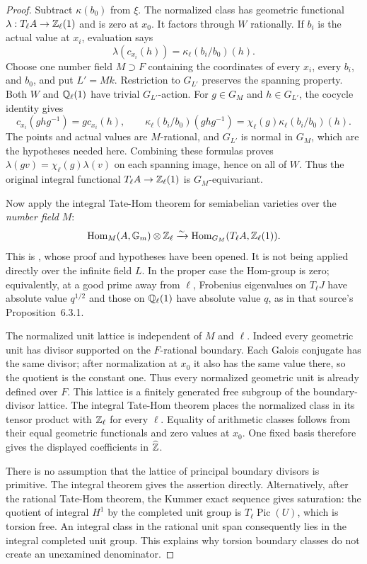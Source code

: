 \begin{proof}
Subtract $\kappa(b_0)$ from $\xi$. The normalized class has
geometric functional
$\lambda:T_\ell A\to\mathbb Z_\ell(1)$ and is zero at $x_0$.
It factors through $W$ rationally. If $b_i$ is the actual value
at $x_i$, evaluation says
\[
 \lambda(c_{x_i}(h))=\kappa_\ell(b_i/b_0)(h).
\]
Choose one number field $M\supset F$ containing the coordinates
of every $x_i$, every $b_i$, and $b_0$, and put $L'=Mk$.
Restriction to $G_{L'}$ preserves the spanning property.
Both $W$ and $\mathbb Q_\ell(1)$ have trivial $G_{L'}$-action.
For $g\in G_M$ and $h\in G_{L'}$, the cocycle identity gives
\[
 c_{x_i}(ghg^{-1})=g c_{x_i}(h),\qquad
 \kappa_\ell(b_i/b_0)(ghg^{-1})
     =\chi_\ell(g)\kappa_\ell(b_i/b_0)(h).
\]
The points and actual values are $M$-rational, and $G_{L'}$
is normal in $G_M$, which are the hypotheses needed here.
Combining these formulas proves
$\lambda(gv)=\chi_\ell(g)\lambda(v)$ on each spanning image,
hence on all of $W$. Thus the original integral functional
$T_\ell A\to\mathbb Z_\ell(1)$ is $G_M$-equivariant.

Now apply the integral Tate-Hom theorem for semiabelian
varieties over the \emph{number field} $M$:
\[
 \operatorname{Hom}_M(A,\mathbb G_m)\otimes\mathbb Z_\ell
 \xrightarrow{\sim}
 \operatorname{Hom}_{G_M}(T_\ell A,\mathbb Z_\ell(1)).
\]
This is \citet[Lemma~6.3.2, pp.~81--82]{F_Jossen2009}, whose
proof and hypotheses have been opened. It is not being applied
directly over the infinite field $L$.
In the proper case the Hom-group is zero; equivalently, at a
good prime away from $\ell$, Frobenius eigenvalues on $T_\ell J$
have absolute value $q^{1/2}$ and those on $\mathbb Q_\ell(1)$ have
absolute value $q$, as in that source's Proposition~6.3.1.

The normalized unit lattice is independent of $M$ and $\ell$.
Indeed every geometric unit has divisor supported on the
$F$-rational boundary. Each Galois conjugate has the same divisor;
after normalization at $x_0$ it also has the same value there,
so the quotient is the constant one. Thus every normalized
geometric unit is already defined over $F$. This lattice is a
finitely generated free subgroup of the boundary-divisor lattice.
The integral Tate-Hom theorem places the normalized class in
its tensor product with $\mathbb Z_\ell$ for every $\ell$. Equality
of arithmetic classes follows from their equal geometric
functionals and zero values at $x_0$. One fixed basis therefore
gives the displayed coefficients in $\widehat{\mathbb Z}$.

There is no assumption that the lattice of principal boundary
divisors is primitive. The integral theorem gives the assertion
directly. Alternatively, after the rational Tate-Hom theorem,
the Kummer exact sequence gives saturation: the quotient of
integral $H^1$ by the completed unit group is
$T_\ell\operatorname{Pic}(U)$, which is torsion free. An
integral class in the rational unit span consequently lies in
the integral completed unit group. This explains why torsion
boundary classes do not create an unexamined denominator.
\end{proof}

